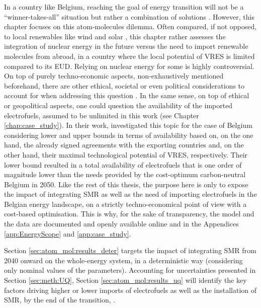 In a country like Belgium, reaching the goal of energy transition will not be a ``winner-takes-all'' situation but rather a combination of solutions \cite{Limpens2020,limpens2021generating}. However, this chapter focuses on this atom-molecules dilemma. Often compared, if not opposed, to local renewables like wind and solar \cite{suna2016nuclear,khatib2016economics}, this chapter rather assesses the integration of nuclear energy in the future versus the need to import renewable molecules from abroad, in a country where the local potential of \gls{VRES} is limited compared to its \gls{EUD}. Relying on nuclear energy for some is highly controversial. On top of purely techno-economic aspects, non-exhaustively mentioned beforehand, there are other ethical, societal or even political considerations to account for when addressing this question \cite{kempf2022}. In the same sense, on top of ethical or geopolitical aspects, one could question the availability of the imported electrofuels, assumed to be unlimited in this work (see Chapter \ref{chap:case_study}). In their work, \citet{lefebvre2022electrofuel} investigated this topic for the case of Belgium considering lower and upper bounds in terms of availability based on, on the one hand, the already signed agreements with the exporting countries and, on the other hand, their maximal technological potential of \gls{VRES}, respectively. Their lower bound resulted in a total availability of electrofuels that is one order of magnitude lower than the needs provided by the cost-optimum carbon-neutral Belgium in 2050. Like the rest of this thesis, the purpose here is only to expose the impact of integrating \gls{SMR} as well as the need of importing electrofuels in the Belgian energy landscape, on a strictly techno-economical point of view with a cost-based optimisation. This is why, for the sake of transparency, the model and the data are documented and openly available online \cite{readthedocs_pathway} and in the Appendices \ref{app:EnergyScope} and \ref{app:case_study}.

Section \ref{sec:atom_mol:results_deter} targets the impact of integrating \gls{SMR} from 2040 onward on the whole-energy system, in a deterministic way (\ie considering only nominal values of the parameters). Accounting for uncertainties presented in Section \ref{sec:meth:UQ}, Section \ref{sec:atom_mol:results_uq} will identify the key factors driving higher or lower imports of electrofuels as well as the installation of \gls{SMR}, by the end of the transition, .

